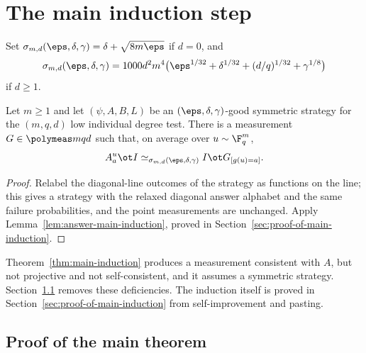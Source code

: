 \chapter{The main induction step}
\label{chap:induction}
\label{sec:induction}

\begin{definition}\label{def:main-induction-error}
	\leanok
	Set $\sigma_{m,d}(\eps,\delta,\gamma)=\delta+\sqrt{8m\eps}$ if $d=0$, and
	\[
		\sigma_{m,d}(\eps,\delta,\gamma)=1000d^2m^4\bigl(\eps^{1/32}+\delta^{1/32}
		+(d/q)^{1/32}+\gamma^{1/8}\bigr)
	\]
	if $d\ge1$.
\end{definition}

\begin{theorem}\label{thm:main-induction}
	\leanok
	Let $m\ge1$ and let $(\psi,A,B,L)$ be an $(\eps,\delta,\gamma)$-good
	symmetric strategy for the $(m,q,d)$ low individual degree test.  There is
	a measurement $G\in\polymeas mqd$ such that, on average over
	$u\sim\F_q^m$,
	\[
		A^u_a\ot I\simeq_{\sigma_{m,d}(\eps,\delta,\gamma)}I\ot G_{[g(u)=a]}.
	\]
\end{theorem}

\begin{proof}
	\leanok
	Relabel the diagonal-line outcomes of the strategy as functions on the
	line; this gives a strategy with the relaxed diagonal answer alphabet and
	the same failure probabilities, and the point measurements are unchanged.
	Apply Lemma~\ref{lem:answer-main-induction}, proved in
	Section~\ref{sec:proof-of-main-induction}.
\end{proof}


Theorem~\ref{thm:main-induction} produces a measurement consistent with $A$,
but not projective and not self-consistent, and it assumes a symmetric
strategy.  Section~\ref{sec:proof-of-main-formal} removes these deficiencies.
The induction itself is proved in Section~\ref{sec:proof-of-main-induction}
from self-improvement and pasting.

\section{Proof of the main theorem}
\label{sec:proof-of-main-formal}


